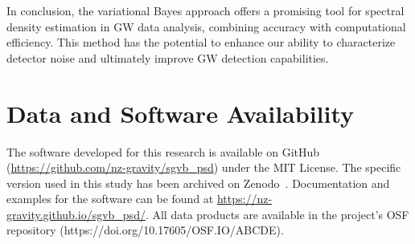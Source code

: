 \documentclass[%
 reprint,
 amsmath,amssymb,
 aps,
 nofootinbib,
]{revtex4-2}
\begin{document}
In conclusion, the variational Bayes approach offers a promising tool for spectral density estimation in GW data analysis, combining accuracy with computational efficiency. This method has the potential to enhance our ability to characterize detector noise and ultimately improve GW detection capabilities.












\section*{Data and Software Availability}
The software developed for this research is available on GitHub (\url{https://github.com/nz-gravity/sgvb_psd}) under the MIT License. 
The specific version used in this study has been archived on Zenodo~\cite{}. 
Documentation and examples for the software can be found at \url{https://nz-gravity.github.io/sgvb_psd/}.
All data products are available in the project's OSF repository (https://doi.org/10.17605/OSF.IO/ABCDE)\cite{}.
\end{document}
